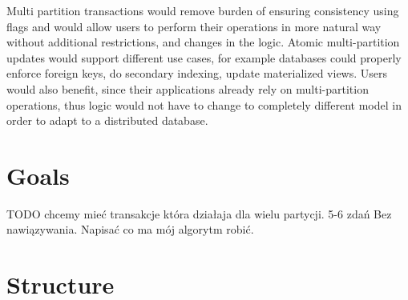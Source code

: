 Multi partition transactions would remove burden of ensuring consistency using flags and would allow users to perform their operations in more natural way without additional restrictions, and changes in the logic. 
Atomic multi-partition updates would support different use cases, for example databases could properly enforce foreign keys, do secondary indexing, update materialized views. Users would also benefit, since their applications already rely on multi-partition operations, thus logic would not have to change to completely different model in order to adapt to a distributed database. 

\section{Goals}
TODO chcemy mieć transakcje która działaja dla wielu partycji. 
5-6 zdań
Bez nawiązywania. Napisać co ma mój algorytm robić.

\section{Structure}\label{sec:introduction:structure}

